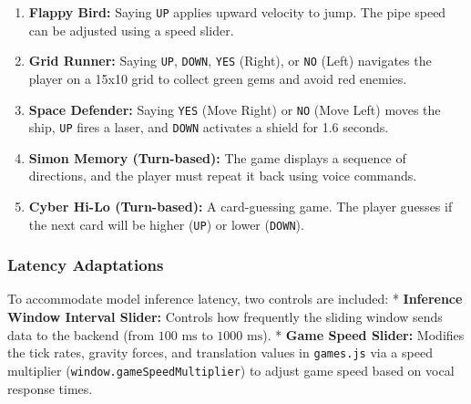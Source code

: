 \begin{enumerate}
    \item \textbf{Flappy Bird:}
    Saying \texttt{UP} applies upward velocity to jump. The pipe speed can be adjusted using a speed slider.
    \item \textbf{Grid Runner:}
    Saying \texttt{UP}, \texttt{DOWN}, \texttt{YES} (Right), or \texttt{NO} (Left) navigates the player on a 15x10 grid to collect green gems and avoid red enemies.
    \item \textbf{Space Defender:}
    Saying \texttt{YES} (Move Right) or \texttt{NO} (Move Left) moves the ship, \texttt{UP} fires a laser, and \texttt{DOWN} activates a shield for 1.6 seconds.
    \item \textbf{Simon Memory (Turn-based):}
    The game displays a sequence of directions, and the player must repeat it back using voice commands.
    \item \textbf{Cyber Hi-Lo (Turn-based):}
    A card-guessing game. The player guesses if the next card will be higher (\texttt{UP}) or lower (\texttt{DOWN}).
\end{enumerate}

\subsubsection{Latency Adaptations}
To accommodate model inference latency, two controls are included:
* \textbf{Inference Window Interval Slider:} Controls how frequently the sliding window sends data to the backend (from $100\text{ ms}$ to $1000\text{ ms}$).
* \textbf{Game Speed Slider:} Modifies the tick rates, gravity forces, and translation values in \texttt{games.js} via a speed multiplier (\texttt{window.gameSpeedMultiplier}) to adjust game speed based on vocal response times.

